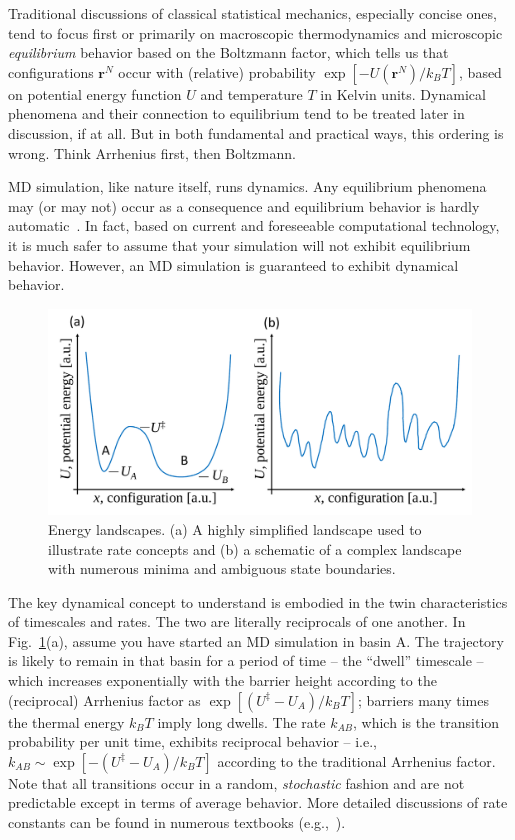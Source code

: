 \documentclass[9pt,bestpractices]{livecoms}
\newcommand{\conf}{\mathbf{r}^N}
\begin{document}
Traditional discussions of classical statistical mechanics, especially concise ones, tend to focus first or primarily on macroscopic thermodynamics and microscopic \emph{equilibrium} behavior based on the Boltzmann factor, which tells us that configurations $\conf$ occur with (relative) probability $\exp[-U(\conf)/k_B T]$, based on potential energy function $U$ and temperature $T$ in Kelvin units.  
Dynamical phenomena and their connection to equilibrium tend to be treated later in discussion, if at all.  
But in both fundamental and practical ways, this ordering is wrong.  
Think Arrhenius first, then Boltzmann.

MD simulation, like nature itself, runs dynamics.  
Any equilibrium phenomena may (or may not) occur as a consequence and equilibrium behavior is hardly automatic~\cite{Zuckerman:2010:}.  
In fact, based on current and foreseeable computational technology, it is much safer to assume that your simulation will not exhibit equilibrium behavior.  
However, an MD simulation is guaranteed to exhibit dynamical behavior.

\begin{figure}[h]
\centering
\includegraphics[width=\linewidth]{simplelandscapes.pdf}
\caption{Energy landscapes.  (a) A highly simplified landscape used to illustrate rate concepts and (b) a schematic of a complex landscape with numerous minima and ambiguous state boundaries.}
\label{landscapes}
\end{figure}

The key dynamical concept to understand is embodied in the twin characteristics of timescales and rates.  
The two are literally reciprocals of one another.  
In Fig.\ \ref{landscapes}(a), assume you have started an MD simulation in basin A.  
The trajectory is likely to remain in that basin for a period of time -- the “dwell” timescale -- which increases exponentially with the barrier height according to the (reciprocal) Arrhenius factor as $\exp[(U^\ddagger - U_A)/k_B T]$; barriers many times the thermal energy $k_BT$ imply long dwells.  
The rate $k_{AB}$, which is the transition probability per unit time, exhibits reciprocal behavior -- i.e., $k_{AB} \sim \exp[-(U^\ddagger - U_A)/k_B T]$ according to the traditional Arrhenius factor.  
Note that all transitions occur in a random, \emph{stochastic} fashion and are not predictable except in terms of average behavior.  
More detailed discussions of rate constants can be found in numerous textbooks (e.g.,~\cite{DillBook, Zuckerman:2010:}).
\end{document}
